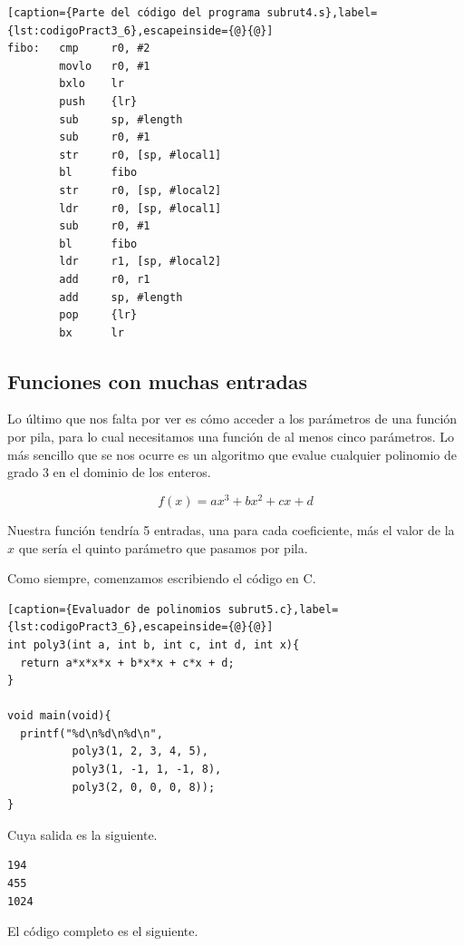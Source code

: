 \begin{lstlisting}[caption={Parte del código del programa subrut4.s},label={lst:codigoPract3_6},escapeinside={@}{@}]
fibo:   cmp     r0, #2
        movlo   r0, #1
        bxlo    lr
        push    {lr}
        sub     sp, #length
        sub     r0, #1
        str     r0, [sp, #local1]
        bl      fibo
        str     r0, [sp, #local2]
        ldr     r0, [sp, #local1]
        sub     r0, #1
        bl      fibo
        ldr     r1, [sp, #local2]
        add     r0, r1
        add     sp, #length
        pop     {lr}
        bx      lr
\end{lstlisting}

\subsection{Funciones con muchas entradas}

Lo último que nos falta por ver es cómo acceder a los parámetros de una función por pila, para
lo cual necesitamos una función de al menos cinco parámetros. Lo más sencillo que se nos ocurre
es un algoritmo que evalue cualquier polinomio de grado 3 en el dominio de los enteros.


\begin{equation}
f(x) = ax^3 + bx^2 + cx + d
\label{eq:polinomio}
\end{equation}


Nuestra función tendría 5 entradas, una para cada coeficiente, más el valor de la $x$ que
sería el quinto parámetro que pasamos por pila.

Como siempre, comenzamos escribiendo el código en C.

\begin{lstlisting}[caption={Evaluador de polinomios subrut5.c},label={lst:codigoPract3_6},escapeinside={@}{@}]
int poly3(int a, int b, int c, int d, int x){
  return a*x*x*x + b*x*x + c*x + d;
}

void main(void){
  printf("%d\n%d\n%d\n",
          poly3(1, 2, 3, 4, 5), 
          poly3(1, -1, 1, -1, 8), 
          poly3(2, 0, 0, 0, 8));
}
\end{lstlisting}

Cuya salida es la siguiente.

\begin{lstlisting}
194
455
1024
\end{lstlisting}

El código completo es el siguiente.


